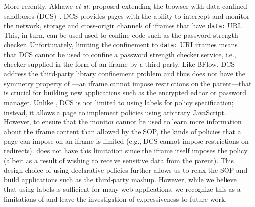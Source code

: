 More recently, Akhawe \emph{et al.} proposed extending the browser
with data-confined sandboxes (DCS)~\cite{Akhawe2013}.
%
DCS provides pages with the ability to intercept and monitor the
network, storage and cross-origin channels of iframes that have
\verb|data:| URI.
%
This, in turn, can be used used to confine code such as the password
strength checker.
%
Unfortunately, limiting the confinement to \verb|data:| URI iframes
means that DCS cannot be used to confine a password strength checker
service, i.e., checker supplied in the form of an iframe by a
third-party.
%
Like BFlow, DCS address the third-party library confinement problem
and thus does not have the symmetry property of \sys{}---an iframe
cannot impose restrictions on the parent---that is crucial for
building new applications such as the encrypted editor or password
manager.
%
Unlike \sys{}, DCS is not limited to using labels for policy
specification; instead, it allows a page to implement policies using
arbitrary JavaScript.
%
However, to ensure that the monitor cannot be used to learn more
information about the iframe content than allowed by the SOP, the
kinds of policies that a page can impose on an iframe is limited
(e.g., DCS cannot impose restrictions on redirects).
%
\sys{} does not have this limitation since the iframe itself imposes
the policy (albeit as a result of wishing to receive sensitive data
from the parent).
%
This design choice of using declarative policies further allows us to
relax the SOP and build applications such as the third-party mashup.
%
However, while we believe that using labels is sufficient for many
web applications, we recognize this as a limitations of \sys{} and
leave the investigation of expressiveness to future work.


